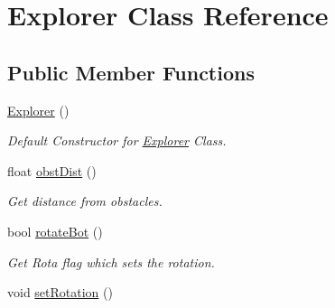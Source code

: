 \hypertarget{classExplorer}{}\section{Explorer Class Reference}
\label{classExplorer}
\subsection*{Public Member Functions}
\begin{DoxyCompactItemize}
\item 
\hyperlink{classExplorer_acbedef0262785b6983d1fe9b4f2c6242}{Explorer} ()\hypertarget{classExplorer_acbedef0262785b6983d1fe9b4f2c6242}{}\label{classExplorer_acbedef0262785b6983d1fe9b4f2c6242}

\begin{DoxyCompactList}\small\item\em Default Constructor for \hyperlink{classExplorer}{Explorer} Class. \end{DoxyCompactList}\item 
float \hyperlink{classExplorer_a12f687220c68689fff2836117cbabcdd}{obst\+Dist} ()
\begin{DoxyCompactList}\small\item\em Get distance from obstacles. \end{DoxyCompactList}\item 
bool \hyperlink{classExplorer_a0cecdf01e97d519673f4650a54890f65}{rotate\+Bot} ()
\begin{DoxyCompactList}\small\item\em Get Rota flag which sets the rotation. \end{DoxyCompactList}\item 
void \hyperlink{classExplorer_a3e025ac39b333bf3b3e095e909051abb}{set\+Rotation} ()\hypertarget{classExplorer_a3e025ac39b333bf3b3e095e909051abb}{}\label{classExplorer_a3e025ac39b333bf3b3e095e909051abb}


\end{DoxyCompactItemize}
